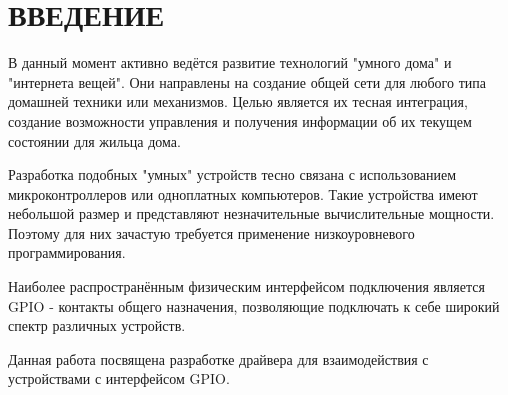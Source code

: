 \section*{ВВЕДЕНИЕ}

В данный момент активно ведётся развитие технологий "умного дома" и "интернета вещей". Они направлены на создание общей сети для любого типа домашней техники или механизмов. Целью является их тесная интеграция, создание возможности управления и получения информации об их текущем состоянии для жильца дома. 

Разработка подобных "умных" устройств тесно связана с использованием микроконтроллеров или одноплатных компьютеров. Такие устройства имеют небольшой размер и представляют незначительные вычислительные мощности. Поэтому для них зачастую требуется применение низкоуровневого программирования. 

Наиболее распространённым физическим интерфейсом подключения является GPIO - контакты общего назначения, позволяющие подключать к себе широкий спектр различных устройств.

Данная работа посвящена разработке драйвера для взаимодействия с устройствами с интерфейсом GPIO. 

\pagebreak